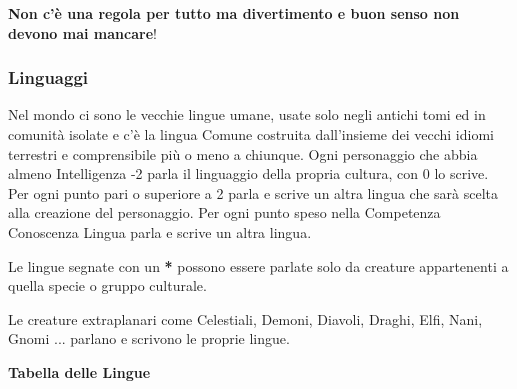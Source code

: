 \begin{multicols}{2}
\begin{narratore}
	\textbf{Non c'è una regola per tutto ma divertimento e buon senso non devono mai mancare}!
\end{narratore}


\titlespacing*{\subsubsection}{0pt}{0.5em}{0.5em}\subsubsection*{Linguaggi}\hypertarget{linguaggi}{}\label{linguaggi}

Nel mondo ci sono le vecchie lingue umane, usate solo negli antichi tomi ed in comunità isolate e c'è la lingua Comune costruita dall'insieme dei vecchi idiomi terrestri e comprensibile più o meno a chiunque. Ogni personaggio che abbia almeno Intelligenza -2 parla il linguaggio della propria cultura, con 0 lo scrive. Per ogni punto pari o superiore a 2 parla e scrive un altra lingua che sarà scelta alla creazione del personaggio. Per ogni punto speso nella Competenza Conoscenza Lingua parla e scrive un altra lingua.

Le lingue segnate con un \textbf{*} possono essere parlate solo da creature appartenenti a quella specie o gruppo culturale.

Le creature extraplanari come Celestiali, Demoni, Diavoli, Draghi, Elfi, Nani, Gnomi ... parlano e scrivono le proprie lingue.

\smallskip

\textbf{Tabella delle Lingue}

\smallskip


\end{multicols}

